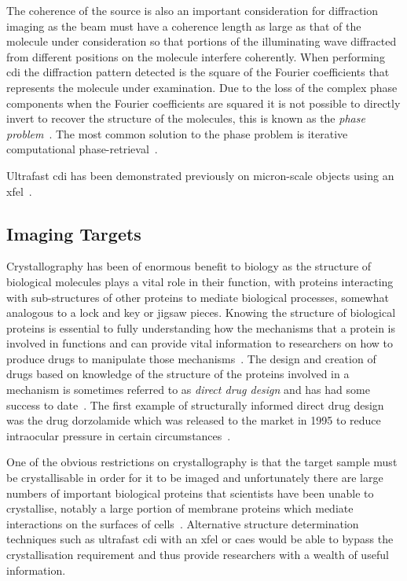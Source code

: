 The coherence of the source is also an important consideration for diffraction imaging as the beam must have a coherence length as large as that of the molecule under consideration so that portions of the illuminating wave diffracted from different positions on the molecule interfere coherently.
When performing \gls{cdi} the diffraction pattern detected is the square of the Fourier coefficients that represents the molecule under examination.
Due to the loss of the complex phase components when the Fourier coefficients are squared it is not possible to directly invert to recover the structure of the molecules, this is known as the \emph{phase problem}~\cite{rodenburg_phase_1989}.
The most common solution to the phase problem is iterative computational phase-retrieval~\cite{chapman_coherent_2010}.

Ultrafast \gls{cdi} has been demonstrated previously on micron-scale objects using an \gls{xfel}~\cite{chapman_femtosecond_2006}.

\subsection{Imaging Targets}

Crystallography has been of enormous benefit to biology as the structure of biological molecules plays a vital role in their function, with proteins interacting with sub-structures of other proteins to mediate biological processes, somewhat analogous to a lock and key or jigsaw pieces.
Knowing the structure of biological proteins is essential to fully understanding how the mechanisms that a protein is involved in functions and can provide vital information to researchers on how to produce drugs to manipulate those mechanisms~\cite{aloy_structural_2006,almen_mapping_2009}.
The design and creation of drugs based on knowledge of the structure of the proteins involved in a mechanism is sometimes referred to as \emph{direct drug design} and has had some success to date~\cite{klebe_recent_2000,jhoti_structure-based_2007,mauser_recent_2008}.
The first example of structurally informed direct drug design was the drug dorzolamide which was released to the market in 1995 to reduce intraocular pressure in certain circumstances~\cite{greer_application_1994}.

One of the obvious restrictions on crystallography is that the target sample must be crystallisable in order for it to be imaged and unfortunately there are large numbers of important biological proteins that scientists have been unable to crystallise, notably a large portion of membrane proteins which mediate interactions on the surfaces of cells~\cite{geerlof_impact_2006}.
Alternative structure determination techniques such as ultrafast \gls{cdi} with an \gls{xfel} or \gls{caes} would be able to bypass the crystallisation requirement and thus provide researchers with a wealth of useful information.

